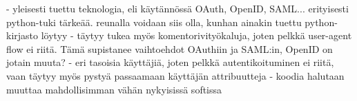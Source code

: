 - yleisesti tuettu teknologia, eli käytännössä OAuth, OpenID, SAML... erityisesti python-tuki tärkeää. reunalla voidaan siis olla, kunhan ainakin tuettu python-kirjasto löytyy
- täytyy tukea myös komentorivityökaluja, joten pelkkä user-agent flow ei riitä. Tämä supistanee vaihtoehdot OAuthiin ja SAML:in, OpenID on jotain muuta?
- eri tasoisia käyttäjiä, joten pelkkä autentikoituminen ei riitä, vaan täytyy myös pystyä passaamaan käyttäjän attribuutteja
- koodia halutaan muuttaa mahdollisimman vähän nykyisissä softissa